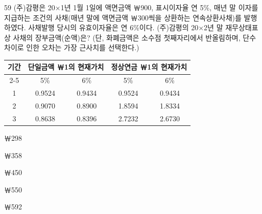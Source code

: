 \begin{question}{59}
(주)감평은 20×1년 1월 1일에 액면금액 ￦900, 표시이자율 연 5\%, 매년 말 이자를 지급하는 조건의 사채(매년 말에 액면금액 ￦300씩을 상환하는 연속상환사채)를 발행하였다. 사채발행 당시의 유효이자율은 연 6\%이다. (주)감평의 20×2년 말 재무상태표 상 사채의 장부금액(순액)은? (단, 화폐금액은 소수점 첫째자리에서 반올림하며, 단수차이로 인한 오차는 가장 근사치를 선택한다.)
\par{\small\centering\begin{tabular}{|c|c|c|c|c|}\hline
\multirow{2}{*}{기간} & \multicolumn{2}{c|}{단일금액 ￦1의 현재가치} & \multicolumn{2}{c|}{정상연금 ￦1의 현재가치} \tabularnewline\cline{2-5}
 & 5\% & 6\% & 5\% & 6\% \tabularnewline\hline
1 & 0.9524 & 0.9434 & 0.9524 & 0.9434 \tabularnewline\hline
2 & 0.9070 & 0.8900 & 1.8594 & 1.8334 \tabularnewline\hline
3 & 0.8638 & 0.8396 & 2.7232 & 2.6730 \tabularnewline\hline
\end{tabular}\par}
\begin{choices}
  \item ￦298
  \item ￦358
  \item ￦450
  \item ￦550
  \item ￦592
\end{choices}
\end{question}
